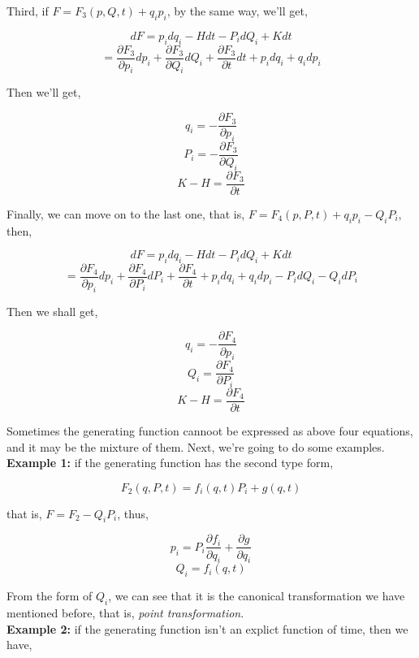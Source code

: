 \documentclass[12pt]{article}
\numberwithin{equation}{section}
\begin{document}
Third, if $ F = F_3(p, Q, t) + q_ip_i $, by the same way, we'll get,

\begin{center}
    \[ dF = p_idq_i - Hdt - P_idQ_i + Kdt \]
    \[ = \frac{\partial F_3}{\partial p_i}dp_i + \frac{\partial F_3}{\partial Q_i}dQ_i + \frac{\partial F_3}{\partial t}dt + p_idq_i + q_idp_i \]
\end{center}

Then we'll get,

\begin{center}
    \[ q_i = - \frac{\partial F_3}{\partial p_i} \]
    \[ P_i = - \frac{\partial F_3}{\partial Q_i} \]
    \[ K - H = \frac{\partial F_3}{\partial t} \]
\end{center}

Finally, we can move on to the last one, that is, $F = F_4(p, P, t) + q_ip_i - Q_iP_i $, then,

\begin{center}
    \[ dF = p_idq_i - Hdt - P_idQ_i + Kdt \]
    \[ = \frac{\partial F_4}{\partial p_i}dp_i + \frac{\partial F_4}{\partial P_i}dP_i + \frac{\partial F_4}{\partial t} + p_idq_i + q_idp_i - P_idQ_i - Q_idP_i \]
\end{center}

Then we shall get,

\begin{center}
    \[ q_i = - \frac{\partial F_4}{\partial p_i} \]
    \[ Q_i = \frac{\partial F_4}{\partial P_i} \]
    \[ K - H = \frac{\partial F_4}{\partial t} \]
\end{center}

Sometimes the generating function cannoot be expressed as above four equations, and it may be the mixture of them. Next, we're going to do some examples.
\\
\indent \textbf{Example 1: }if the generating function has the second type form,

\begin{center}
    \[ F_2(q, P, t) = f_i(q, t)P_i + g(q, t) \]
\end{center}

that is, $F = F_2 - Q_iP_i $, thus, 

\begin{center}
    \[ p_i = P_i \frac{\partial f_i}{\partial q_i} + \frac{\partial g}{\partial q_i} \]
    \[ Q_i = f_i(q, t) \]
\end{center}

From the form of $Q_i$, we can see that it is the canonical transformation we have mentioned before, that is, \textit{point transformation}.
\\
\indent \textbf{Example 2: }if the generating function isn't an explict function of time, then we have,
\end{document}
